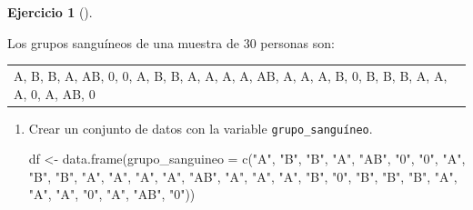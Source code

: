 \documentclass[
  a4paper,
]{scrreport}
\newenvironment{Shaded}{\begin{snugshade}}{\end{snugshade}}
\newcommand{\AttributeTok}[1]{\textcolor[rgb]{0.40,0.45,0.13}{#1}}
\newcommand{\FunctionTok}[1]{\textcolor[rgb]{0.28,0.35,0.67}{#1}}
\newcommand{\NormalTok}[1]{\textcolor[rgb]{0.00,0.23,0.31}{#1}}
\newcommand{\OtherTok}[1]{\textcolor[rgb]{0.00,0.23,0.31}{#1}}
\newcommand{\StringTok}[1]{\textcolor[rgb]{0.13,0.47,0.30}{#1}}
\theoremstyle{definition}
\newtheorem{exercise}{Ejercicio}[chapter]
\theoremstyle{remark}
\begin{document}
\begin{exercise}[]\protect\hypertarget{exr-frecuencias-graficos-3}{}\label{exr-frecuencias-graficos-3}

Los grupos sanguíneos de una muestra de 30 personas son:

\begin{longtable}[]{@{}
  >{\centering\arraybackslash}p{}@{}}
\toprule\noalign{}
\endhead
\bottomrule\noalign{}
\endlastfoot
A, B, B, A, AB, 0, 0, A, B, B, A, A, A, A, AB, A, A, A, B, 0, B, B, B,
A, A, A, 0, A, AB, 0 \\
\end{longtable}

\begin{enumerate}
\def\labelenumi{\alph{enumi}.}
\item
  Crear un conjunto de datos con la variable \texttt{grupo\_sanguíneo}.

  \begin{tcolorbox}[enhanced jigsaw, coltitle=black, left=2mm, colback=white, leftrule=.75mm, toptitle=1mm, breakable, bottomrule=.15mm, titlerule=0mm, bottomtitle=1mm, title=\textcolor{quarto-callout-tip-color}{\faLightbulb}\hspace{0.5em}{Solución}, arc=.35mm, toprule=.15mm, rightrule=.15mm, colframe=quarto-callout-tip-color-frame, opacityback=0, colbacktitle=quarto-callout-tip-color!10!white, opacitybacktitle=0.6]

\begin{Shaded}
\begin{Highlighting}[]
\NormalTok{df }\OtherTok{\textless{}{-}} \FunctionTok{data.frame}\NormalTok{(}\AttributeTok{grupo\_sanguineo =} \FunctionTok{c}\NormalTok{(}\StringTok{"A"}\NormalTok{, }\StringTok{"B"}\NormalTok{, }\StringTok{"B"}\NormalTok{, }\StringTok{"A"}\NormalTok{, }\StringTok{"AB"}\NormalTok{, }\StringTok{"0"}\NormalTok{, }\StringTok{"0"}\NormalTok{, }\StringTok{"A"}\NormalTok{, }\StringTok{"B"}\NormalTok{, }\StringTok{"B"}\NormalTok{, }\StringTok{"A"}\NormalTok{, }\StringTok{"A"}\NormalTok{, }\StringTok{"A"}\NormalTok{, }\StringTok{"A"}\NormalTok{, }\StringTok{"AB"}\NormalTok{, }\StringTok{"A"}\NormalTok{, }\StringTok{"A"}\NormalTok{, }\StringTok{"A"}\NormalTok{, }\StringTok{"B"}\NormalTok{, }\StringTok{"0"}\NormalTok{, }\StringTok{"B"}\NormalTok{, }\StringTok{"B"}\NormalTok{, }\StringTok{"B"}\NormalTok{, }\StringTok{"A"}\NormalTok{, }\StringTok{"A"}\NormalTok{, }\StringTok{"A"}\NormalTok{, }\StringTok{"0"}\NormalTok{, }\StringTok{"A"}\NormalTok{, }\StringTok{"AB"}\NormalTok{, }\StringTok{"0"}\NormalTok{))}
\end{Highlighting}
\end{Shaded}


\end{tcolorbox}
\end{enumerate}
\end{exercise}
\end{document}
